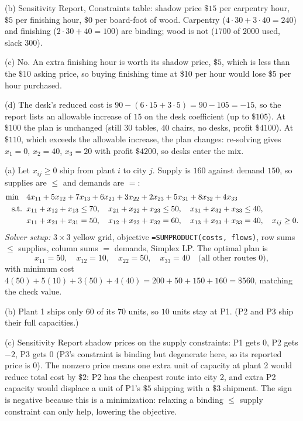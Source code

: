 (b) Sensitivity Report, Constraints table: shadow price $\$15$ per carpentry hour, $\$5$ per finishing hour, $\$0$ per board-foot of wood. Carpentry ($4 \cdot 30 + 3 \cdot 40 = 240$) and finishing ($2 \cdot 30 + 40 = 100$) are binding; wood is not ($1700$ of $2000$ used, slack $300$).

(c) No. An extra finishing hour is worth its shadow price, $\$5$, which is less than the $\$10$ asking price, so buying finishing time at \$10 per hour would lose \$5 per hour purchased.

(d) The desk's reduced cost is $90 - (6 \cdot 15 + 3 \cdot 5) = 90 - 105 = -15$, so the report lists an allowable increase of $15$ on the desk coefficient (up to $\$105$). At $\$100$ the plan is unchanged (still $30$ tables, $40$ chairs, no desks, profit $\$4100$). At $\$110$, which exceeds the allowable increase, the plan changes: re-solving gives $x_1 = 0$, $x_2 = 40$, $x_3 = 20$ with profit $\$4200$, so desks enter the mix.


(a) Let $x_{ij} \geq 0$ ship from plant $i$ to city $j$. Supply is $160$ against demand $150$, so supplies are $\leq$ and demands are $=$:
\begin{align*}
\min \quad & 4x_{11} + 5x_{12} + 7x_{13} + 6x_{21} + 3x_{22} + 2x_{23} + 5x_{31} + 8x_{32} + 4x_{33}\\
\text{s.t.}\;\; & x_{11}+x_{12}+x_{13} \leq 70, \quad x_{21}+x_{22}+x_{23} \leq 50, \quad x_{31}+x_{32}+x_{33} \leq 40,\\
& x_{11}+x_{21}+x_{31} = 50, \quad x_{12}+x_{22}+x_{32} = 60, \quad x_{13}+x_{23}+x_{33} = 40, \quad x_{ij} \geq 0.
\end{align*}
\emph{Solver setup:} $3 \times 3$ yellow grid, objective \texttt{=SUMPRODUCT(costs, flows)}, row sums $\leq$ supplies, column sums $=$ demands, Simplex LP. The optimal plan is
\[
x_{11} = 50, \quad x_{12} = 10, \quad x_{22} = 50, \quad x_{33} = 40 \quad \text{(all other routes 0)},
\]
with minimum cost $4(50) + 5(10) + 3(50) + 4(40) = 200 + 50 + 150 + 160 = \$560$, matching the check value.

(b) Plant 1 ships only $60$ of its $70$ units, so $10$ units stay at P1. (P2 and P3 ship their full capacities.)

(c) Sensitivity Report shadow prices on the supply constraints: P1 gets $0$, P2 gets $-2$, P3 gets $0$ (P3's constraint is binding but degenerate here, so its reported price is $0$). The nonzero price means one extra unit of capacity at plant 2 would reduce total cost by $\$2$: P2 has the cheapest route into city 2, and extra P2 capacity would displace a unit of P1's $\$5$ shipping with a $\$3$ shipment. The sign is negative because this is a minimization: relaxing a binding $\leq$ supply constraint can only help, lowering the objective.

